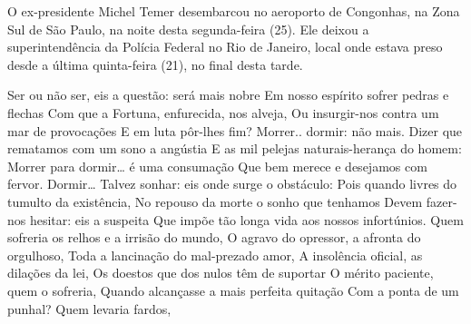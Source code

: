 \label{secintro}

O ex-presidente Michel Temer desembarcou no aeroporto de Congonhas, na Zona Sul de São Paulo, na noite desta segunda-feira (25). Ele deixou a superintendência da Polícia Federal no Rio de Janeiro, local onde estava preso desde a última quinta-feira (21), no final desta tarde.

Ser ou não ser, eis a questão: será mais nobre
Em nosso espírito sofrer pedras e flechas
Com que a Fortuna, enfurecida, nos alveja,
Ou insurgir-nos contra um mar de provocações
E em luta pôr-lhes fim? Morrer.. dormir: não mais.
Dizer que rematamos com um sono a angústia
E as mil pelejas naturais-herança do homem:
Morrer para dormir… é uma consumação
Que bem merece e desejamos com fervor.
Dormir… Talvez sonhar: eis onde surge o obstáculo:
Pois quando livres do tumulto da existência,
No repouso da morte o sonho que tenhamos
Devem fazer-nos hesitar: eis a suspeita
Que impõe tão longa vida aos nossos infortúnios.
Quem sofreria os relhos e a irrisão do mundo,
O agravo do opressor, a afronta do orgulhoso,
Toda a lancinação do mal-prezado amor,
A insolência oficial, as dilações da lei,
Os doestos que dos nulos têm de suportar
O mérito paciente, quem o sofreria,
Quando alcançasse a mais perfeita quitação
Com a ponta de um punhal? Quem levaria fardos,





